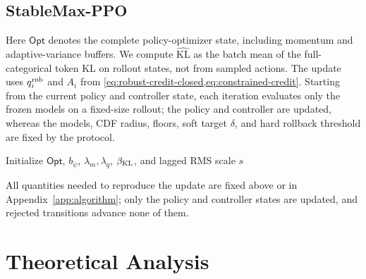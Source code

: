 \documentclass{article}
\theoremstyle{definition}
\theoremstyle{remark}
\begin{document}
\subsection{StableMax-PPO}
\label{subsec:algorithm}
Here \(\mathsf{Opt}\) denotes the complete policy-optimizer state, including
momentum and adaptive-variance buffers.  We compute
\(\widehat{\mathrm{KL}}\) as the batch mean of the full-categorical token KL on
rollout states, not from sampled actions.  The update uses \(q_i^{\rm rob}\) and
\(A_i\) from \cref{eq:robust-credit-closed,eq:constrained-credit}.  Starting
from the current policy and controller state, each iteration evaluates only the
frozen models on a fixed-size rollout; the policy and controller are updated,
whereas the models, CDF radius, floors, soft target \(\delta\), and hard
rollback threshold are fixed by the protocol.
\begin{algorithm}[H]
\caption{StableMax-PPO update}
\label{alg:stablemax}
Initialize \(\mathsf{Opt}\), \(b_\psi\), \(\lambda_m,\lambda_q\),
\(\beta_{\rm KL}\), and lagged RMS scale \(s\)\;
\end{algorithm}
All quantities needed to reproduce the update are fixed above or in
Appendix~\ref{app:algorithm}; only the policy and controller states are
updated, and rejected transitions advance none of them.

\section{Theoretical Analysis}
\label{sec:theory}
\end{document}
